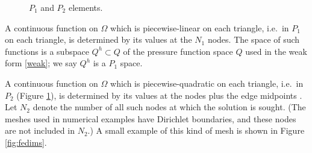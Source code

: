 \documentclass[letterpaper,final,12pt,reqno]{amsart}
\begin{document}
\begin{figure}[ht]
\caption{$P_1$ and $P_2$ elements.}
\label{fig:fedofs}
\end{figure}

A continuous function on $\Omega$ which is piecewise-linear on each triangle, i.e.~in $P_1$ on each triangle, is determined by its values at the $N_1$ nodes.  The space of such functions is a subspace $Q^h \subset Q$ of the pressure function space $Q$ used in the weak form \eqref{weak}; we say $Q^h$ is a $P_1$ space.

A continuous function on $\Omega$ which is piecewise-quadratic on each triangle, i.e.~in $P_2$ (Figure \ref{fig:fedofs}), is determined by its values at the nodes plus the edge midpoints \cite{Elmanetal2014}.  Let $N_2$ denote the number of all such nodes at which the solution is sought.  (The meshes used in numerical examples have Dirichlet boundaries, and these nodes are not included in $N_2$.)  A small example of this kind of mesh is shown in Figure \ref{fig:fedims}.
\end{document}
